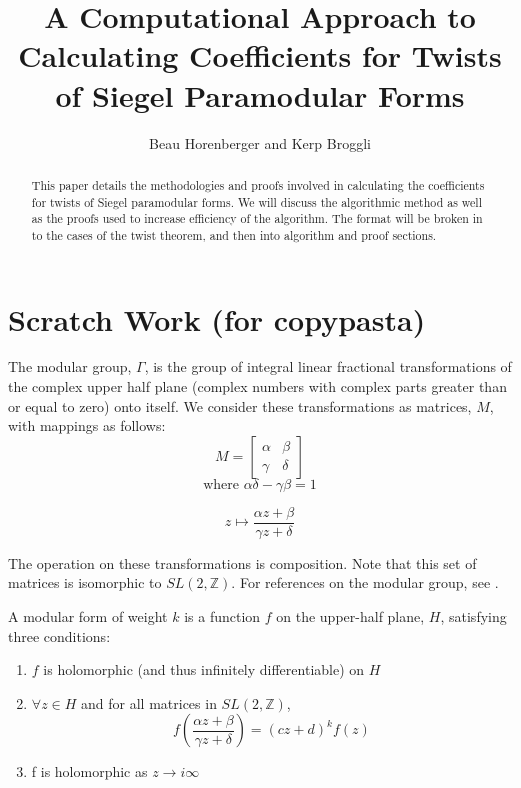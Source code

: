 \documentclass[11pt, oneside]{amsart}
\title{A Computational Approach to Calculating Coefficients for Twists of Siegel Paramodular Forms}
\author{Beau Horenberger and Kerp Broggli}
\begin{document}
\maketitle
\begin{abstract}

This paper details the methodologies and proofs involved in calculating the coefficients for twists of Siegel paramodular forms. We will discuss the algorithmic method as well as the proofs used to increase efficiency of the algorithm. The format will be broken in to the cases of the twist theorem, and then into algorithm and proof sections.

\end{abstract}

\section{Scratch Work (for copypasta)}

The modular group, $\Gamma$, is the group of integral linear fractional transformations of the complex upper half plane (complex numbers with complex parts greater than or equal to zero) onto itself. We consider these transformations as matrices, $M$, with mappings as follows:
\[
M=
\begin{bmatrix}

\alpha &	\beta \\
\gamma & \delta

\end{bmatrix}
\]
$$\text{where }\alpha\delta-\gamma\beta=1$$

\[
z \mapsto \frac{\alpha z + \beta}{\gamma z + \delta}
\]

The operation on these transformations is composition. Note that this set of matrices is isomorphic to $SL(2, \mathbb{Z})$.  For references on the modular group, see \cite{Stein}.

A modular form of weight $k$ is a function $f$ on the upper-half plane, $H$, satisfying three conditions:

\begin{enumerate}
	\item $f$ is holomorphic (and thus infinitely differentiable) on $H$
	\item $\forall z \in H$ and for all matrices in $SL(2, \mathbb{Z})$,
	$$f\left( \frac{\alpha z + \beta}{\gamma z + \delta} \right) = (cz+d)^k f(z)$$
	\item f is holomorphic as $z\rightarrow i\infty$
\end{enumerate}
\end{document}
